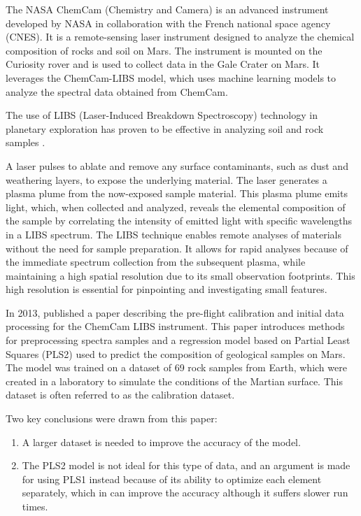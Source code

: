 The NASA ChemCam (Chemistry and Camera) is an advanced instrument developed by NASA in collaboration with the French national space agency (CNES).
It is a remote-sensing laser instrument designed to analyze the chemical composition of rocks and soil on Mars\cite{chemcam_nasa_website}.
The instrument is mounted on the Curiosity rover and is used to collect data in the Gale Crater on Mars\cite{curiosity_nasa_website}.
It leverages the ChemCam-LIBS model, which uses machine learning models to analyze the spectral data obtained from ChemCam.\cite{andersonImprovedAccuracyQuantitative2017}\cite{cleggRecalibrationMarsScience2017}

The use of LIBS (Laser-Induced Breakdown Spectroscopy) technology in planetary exploration has proven to be effective in analyzing soil and rock samples \cite{knight_characterization_2000}.

A laser pulses to ablate and remove any surface contaminants, such as dust and weathering layers, to expose the underlying material.
The laser generates a plasma plume from the now-exposed sample material.
This plasma plume emits light, which, when collected and analyzed, reveals the elemental composition of the sample by correlating the intensity of emitted light with specific wavelengths in a LIBS spectrum.
The LIBS technique enables remote analyses of materials without the need for sample preparation.
It allows for rapid analyses because of the immediate spectrum collection from the subsequent plasma, while maintaining a high spatial resolution due to its small observation footprints.
This high resolution is essential for pinpointing and investigating small features. \cite{wiens_chemcam_2012}

In 2013, \citeauthor{wiens_pre-flight_2013} published a paper describing the pre-flight calibration and initial data processing for the ChemCam LIBS instrument.
This paper introduces methods for preprocessing spectra samples and a regression model based on Partial Least Squares (PLS2) used to predict the composition of geological samples on Mars.
The model was trained on a dataset of 69 rock samples from Earth, which were created in a laboratory to simulate the conditions of the Martian surface.
This dataset is often referred to as the calibration dataset.

Two key conclusions were drawn from this paper:
\begin{enumerate}
    \item A larger dataset is needed to improve the accuracy of the model.
    \item The PLS2 model is not ideal for this type of data, and an argument is made for using PLS1 instead because of its ability to optimize each element separately, which in can improve the accuracy although it suffers slower run times.
\end{enumerate}

